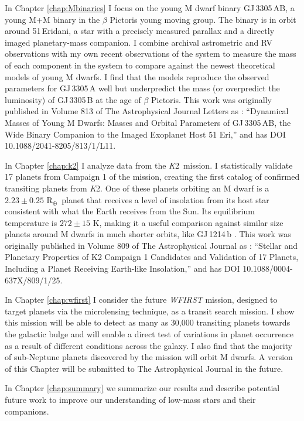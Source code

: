 \documentclass[12pt]{caltech_thesis}
\newcommand{\KT}{{\textit K2}}
\newcommand{\rearth}{{R$_\oplus$}}
\begin{document}
In Chapter \ref{chap:Mbinaries} I focus on the young M dwarf binary 
GJ\,3305\,AB, a young M+M binary in the $\beta$ Pictoris young moving group.
The binary is in orbit around 51\,Eridani, a star with a precisely measured parallax and
a directly imaged planetary-mass companion.
I combine archival astrometric and RV observations with my own recent observations of the
system to measure the mass of each component in the system to compare against the newest
theoretical models of young M dwarfs. 
I find that the models reproduce the observed parameters for GJ\,3305\,A well but 
underpredict the mass (or overpredict the luminosity) of GJ\,3305\,B at the age of $\beta$ Pictoris.
This work was originally published in Volume 813 of The Astrophysical Journal Letters
as \citet{Montet15c}: ``Dynamical Masses of Young M Dwarfs: Masses and Orbital Parameters of GJ\,3305\,AB, the Wide Binary Companion to the Imaged Exoplanet Host 51 Eri,''
and has DOI 10.1088/2041-8205/813/1/L11.

In Chapter \ref{chap:k2} I analyze data from the \KT\ mission.
I statistically validate 17 planets from Campaign 1 of the mission, creating the first
catalog of confirmed transiting planets from \KT.
One of these planets orbiting an M dwarf is a $2.23 \pm 0.25$ \rearth\ planet that receives
a level of insolation from its host star consistent with what the Earth receives from the
Sun. 
Its equilibrium temperature is $272 \pm 15$ K, making it a useful comparison 
against similar size planets around M dwarfs in much shorter orbits, like GJ\,1214\,b
\citep{Charbonneau09}.
This work was originally published in Volume 809 of The Astrophysical Journal
as \citet{Montet15b}: ``Stellar and Planetary Properties of K2 Campaign 1 Candidates and Validation of 17 Planets, Including a Planet Receiving Earth-like Insolation,'' and has DOI 10.1088/0004-637X/809/1/25.

In Chapter \ref{chap:wfirst} I consider the future \textit{WFIRST} mission, designed to target planets via the microlensing technique, as a transit search mission. I show
this mission will be able to detect as many as 30,000 transiting planets towards the
galactic bulge and will enable a direct test of variations in planet occurrence 
as a result of different conditions across the galaxy. 
I also find that the majority of
sub-Neptune planets discovered by the mission will orbit M dwarfs. 
A version of this Chapter will be submitted
to The Astrophysical Journal in the future.

In Chapter \ref{chap:summary} we summarize our results and describe potential
future work to improve our understanding of low-mass stars and their companions. 
\end{document}
